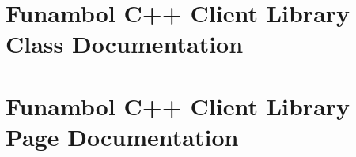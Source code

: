 \documentclass[a4paper]{book}
\begin{document}
\chapter{Funambol C++ Client Library Class Documentation}



















































\chapter{Funambol C++ Client Library Page Documentation}


\printindex
\end{document}
